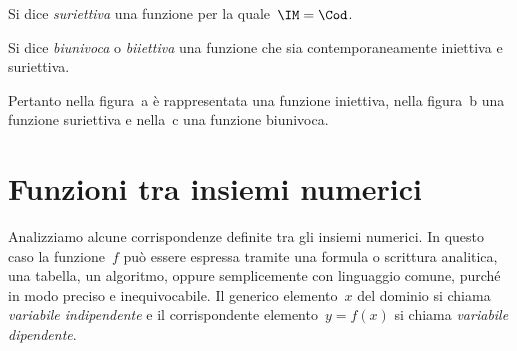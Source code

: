 \begin{definizione}
Si dice \emph{suriettiva} una funzione per la quale~$\IM = \Cod$.
\end{definizione}

\begin{definizione}
Si dice \emph{biunivoca} o \emph{biiettiva} una funzione che sia
contemporaneamente iniettiva e suriettiva.
\end{definizione}

Pertanto nella figura~a è rappresentata una funzione iniettiva, nella figura~b una
funzione suriettiva e nella~c una funzione biunivoca.

 \vspazio\ovalbox{\risolvii \ref{ese:\thechapter.4}, \ref{ese:\thechapter.5}}
% 

\section{Funzioni tra insiemi numerici}

Analizziamo alcune corrispondenze definite tra gli insiemi numerici. In
questo caso la funzione~$f$ può essere espressa
tramite una formula o scrittura analitica, una tabella, un algoritmo,
oppure semplicemente con linguaggio comune, purché in modo preciso e
inequivocabile. Il generico elemento~$x$ del dominio si chiama
\emph{variabile indipendente} e il corrispondente elemento~$y =f(x)$ si chiama \emph{variabile dipendente}.


